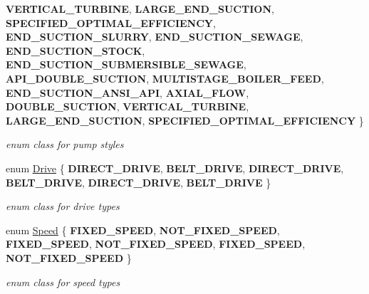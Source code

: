 \begin{DoxyCompactItemize}
{\bfseries V\+E\+R\+T\+I\+C\+A\+L\+\_\+\+T\+U\+R\+B\+I\+NE}, 
{\bfseries L\+A\+R\+G\+E\+\_\+\+E\+N\+D\+\_\+\+S\+U\+C\+T\+I\+ON}, 
{\bfseries S\+P\+E\+C\+I\+F\+I\+E\+D\+\_\+\+O\+P\+T\+I\+M\+A\+L\+\_\+\+E\+F\+F\+I\+C\+I\+E\+N\+CY}, 
\newline
{\bfseries E\+N\+D\+\_\+\+S\+U\+C\+T\+I\+O\+N\+\_\+\+S\+L\+U\+R\+RY}, 
{\bfseries E\+N\+D\+\_\+\+S\+U\+C\+T\+I\+O\+N\+\_\+\+S\+E\+W\+A\+GE}, 
{\bfseries E\+N\+D\+\_\+\+S\+U\+C\+T\+I\+O\+N\+\_\+\+S\+T\+O\+CK}, 
{\bfseries E\+N\+D\+\_\+\+S\+U\+C\+T\+I\+O\+N\+\_\+\+S\+U\+B\+M\+E\+R\+S\+I\+B\+L\+E\+\_\+\+S\+E\+W\+A\+GE}, 
\newline
{\bfseries A\+P\+I\+\_\+\+D\+O\+U\+B\+L\+E\+\_\+\+S\+U\+C\+T\+I\+ON}, 
{\bfseries M\+U\+L\+T\+I\+S\+T\+A\+G\+E\+\_\+\+B\+O\+I\+L\+E\+R\+\_\+\+F\+E\+ED}, 
{\bfseries E\+N\+D\+\_\+\+S\+U\+C\+T\+I\+O\+N\+\_\+\+A\+N\+S\+I\+\_\+\+A\+PI}, 
{\bfseries A\+X\+I\+A\+L\+\_\+\+F\+L\+OW}, 
\newline
{\bfseries D\+O\+U\+B\+L\+E\+\_\+\+S\+U\+C\+T\+I\+ON}, 
{\bfseries V\+E\+R\+T\+I\+C\+A\+L\+\_\+\+T\+U\+R\+B\+I\+NE}, 
{\bfseries L\+A\+R\+G\+E\+\_\+\+E\+N\+D\+\_\+\+S\+U\+C\+T\+I\+ON}, 
{\bfseries S\+P\+E\+C\+I\+F\+I\+E\+D\+\_\+\+O\+P\+T\+I\+M\+A\+L\+\_\+\+E\+F\+F\+I\+C\+I\+E\+N\+CY}
 \}\begin{DoxyCompactList}\small\item\em enum class for pump styles \end{DoxyCompactList}
\item 
\mbox{\label{class_pump_a32bf0ade131a11bb3b3fb374f638e983}} 
enum \hyperlink{class_pump_a32bf0ade131a11bb3b3fb374f638e983}{Drive} \{ \newline
{\bfseries D\+I\+R\+E\+C\+T\+\_\+\+D\+R\+I\+VE}, 
{\bfseries B\+E\+L\+T\+\_\+\+D\+R\+I\+VE}, 
{\bfseries D\+I\+R\+E\+C\+T\+\_\+\+D\+R\+I\+VE}, 
{\bfseries B\+E\+L\+T\+\_\+\+D\+R\+I\+VE}, 
\newline
{\bfseries D\+I\+R\+E\+C\+T\+\_\+\+D\+R\+I\+VE}, 
{\bfseries B\+E\+L\+T\+\_\+\+D\+R\+I\+VE}
 \}\begin{DoxyCompactList}\small\item\em enum class for drive types \end{DoxyCompactList}
\item 
\mbox{\label{class_pump_ae443603074ebca82f0b89209482d10b6}} 
enum \hyperlink{class_pump_ae443603074ebca82f0b89209482d10b6}{Speed} \{ \newline
{\bfseries F\+I\+X\+E\+D\+\_\+\+S\+P\+E\+ED}, 
{\bfseries N\+O\+T\+\_\+\+F\+I\+X\+E\+D\+\_\+\+S\+P\+E\+ED}, 
{\bfseries F\+I\+X\+E\+D\+\_\+\+S\+P\+E\+ED}, 
{\bfseries N\+O\+T\+\_\+\+F\+I\+X\+E\+D\+\_\+\+S\+P\+E\+ED}, 
\newline
{\bfseries F\+I\+X\+E\+D\+\_\+\+S\+P\+E\+ED}, 
{\bfseries N\+O\+T\+\_\+\+F\+I\+X\+E\+D\+\_\+\+S\+P\+E\+ED}
 \}\begin{DoxyCompactList}\small\item\em enum class for speed types \end{DoxyCompactList}
\end{DoxyCompactItemize}
